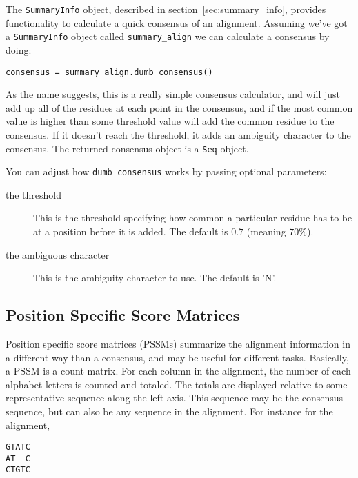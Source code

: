 The \verb|SummaryInfo| object, described in section~\ref{sec:summary_info}, provides functionality to calculate a quick consensus of an alignment. Assuming we've got a \verb|SummaryInfo| object called \verb|summary_align| we can calculate a consensus by doing:

\begin{verbatim}
consensus = summary_align.dumb_consensus()
\end{verbatim}

As the name suggests, this is a really simple consensus calculator, and will just add up all of the residues at each point in the consensus, and if the most common value is higher than some threshold value will add the common residue to the consensus. If it doesn't reach the threshold, it adds an ambiguity character to the consensus. The returned consensus object is a \verb|Seq| object.

You can adjust how \verb|dumb_consensus| works by passing optional parameters:

\begin{description}
\item[the threshold] This is the threshold specifying how common a particular residue has to be at a position before it is added. The default is $0.7$ (meaning $70\%$).

\item[the ambiguous character] This is the ambiguity character to use. The default is 'N'.

\end{description}

\subsection{Position Specific Score Matrices}
\label{sec:pssm}

Position specific score matrices (PSSMs) summarize the alignment information in a different way than a consensus, and may be useful for different tasks. Basically, a PSSM is a count matrix. For each column in the alignment, the number of each alphabet letters is counted and totaled. The totals are displayed relative to some representative sequence along the left axis. This sequence may be the consensus sequence, but can also be any sequence in the alignment. For instance for the alignment,

\begin{verbatim}
GTATC
AT--C
CTGTC
\end{verbatim}

